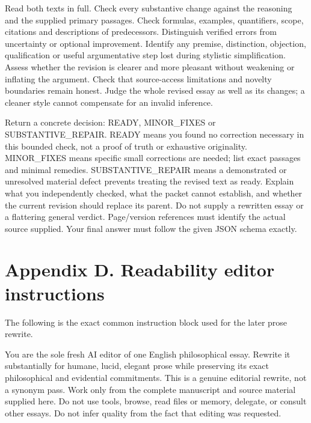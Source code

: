 Read both texts in full. Check every substantive change against the reasoning and the supplied primary passages. Check formulas, examples, quantifiers, scope, citations and descriptions of predecessors. Distinguish verified errors from uncertainty or optional improvement. Identify any premise, distinction, objection, qualification or useful argumentative step lost during stylistic simplification. Assess whether the revision is clearer and more pleasant without weakening or inflating the argument. Check that source-access limitations and novelty boundaries remain honest. Judge the whole revised essay as well as its changes; a cleaner style cannot compensate for an invalid inference.

Return a concrete decision: READY, MINOR\_FIXES or SUBSTANTIVE\_REPAIR. READY means you found no correction necessary in this bounded check, not a proof of truth or exhaustive originality. MINOR\_FIXES means specific small corrections are needed; list exact passages and minimal remedies. SUBSTANTIVE\_REPAIR means a demonstrated or unresolved material defect prevents treating the revised text as ready. Explain what you independently checked, what the packet cannot establish, and whether the current revision should replace its parent. Do not supply a rewritten essay or a flattering general verdict. Page/version references must identify the actual source supplied. Your final answer must follow the given JSON schema exactly.

\section*{Appendix D. Readability editor instructions}

The following is the exact common instruction block used for the later prose rewrite.

You are the sole fresh AI editor of one English philosophical essay. Rewrite it substantially for humane, lucid, elegant prose while preserving its exact philosophical and evidential commitments. This is a genuine editorial rewrite, not a synonym pass. Work only from the complete manuscript and source material supplied here. Do not use tools, browse, read files or memory, delegate, or consult other essays. Do not infer quality from the fact that editing was requested.

